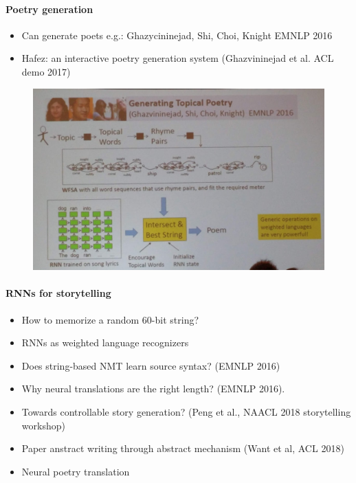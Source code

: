 \paragraph{Poetry generation}
\begin{itemize}
	\item Can generate poets e.g.: Ghazycininejad, Shi, Choi, Knight EMNLP 2016
	\item Hafez: an interactive poetry generation system (Ghazvininejad et al. ACL demo 2017)
\end{itemize}
\begin{figure}[h]
	\centering 
	\includegraphics[scale=0.8]{fig0603/kn-generate-poetry}
\end{figure}

\paragraph{RNNs for storytelling}
\begin{itemize}
	\item How to memorize a random 60-bit string?
	\item RNNs as weighted language recognizers \cite{Chen2018Recurrent}
	\item Does string-based NMT learn source syntax? (EMNLP 2016)
	\item Why neural translations are the right length? (EMNLP 2016). 
	\item Towards controllable story generation? (Peng et al., NAACL 2018 storytelling workshop) 
	\item Paper anstract writing through abstract mechanism (Want et al, ACL 2018)
	\item Neural poetry translation \cite{Ghazvininejad2018Neural}
\end{itemize}


